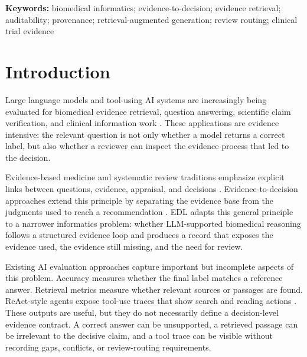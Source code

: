 \documentclass[11pt,a4paper]{article}
\begin{document}
\begin{abstract}
\textbf{Conclusion:} Within an audit-evaluable public biomedical benchmark corpus, the evaluated EDL agent/controller implementation improved benchmark-defined evidence binding and retrieval coverage, with lower overall final-label accuracy than ReAct in the evidence-seeking setting. Substantive evidence sufficiency, gap/conflict correctness, and citation entailment were not independently adjudicated. These findings provide initial evidence for operationalizing the proposed protocol, not for autonomous clinical safety, deployment readiness, or all EDL implementations.
\end{abstract}

\textbf{Keywords:} biomedical informatics; evidence-to-decision; evidence retrieval; auditability; provenance; retrieval-augmented generation; review routing; clinical trial evidence

\section{Introduction}

Large language models and tool-using AI systems are increasingly being evaluated for biomedical evidence retrieval, question answering, scientific claim verification, and clinical information work \cite{moor2023foundation,singhal2023clinical,rajpurkar2022health}. These applications are evidence intensive: the relevant question is not only whether a model returns a correct label, but also whether a reviewer can inspect the evidence process that led to the decision.

Evidence-based medicine and systematic review traditions emphasize explicit links between questions, evidence, appraisal, and decisions \cite{sackett1996ebm,mulrow1997chain,cook1997synthesis}. Evidence-to-decision approaches extend this principle by separating the evidence base from the judgments used to reach a recommendation \cite{alonso2016etd1,alonso2016etd2}. EDL adapts this general principle to a narrower informatics problem: whether LLM-supported biomedical reasoning follows a structured evidence loop and produces a record that exposes the evidence used, the evidence still missing, and the need for review.

Existing AI evaluation approaches capture important but incomplete aspects of this problem. Accuracy measures whether the final label matches a reference answer. Retrieval metrics measure whether relevant sources or passages are found. ReAct-style agents expose tool-use traces that show search and reading actions \cite{yao2023react}. These outputs are useful, but they do not necessarily define a decision-level evidence contract. A correct answer can be unsupported, a retrieved passage can be irrelevant to the decisive claim, and a tool trace can be visible without recording gaps, conflicts, or review-routing requirements.
\end{document}
